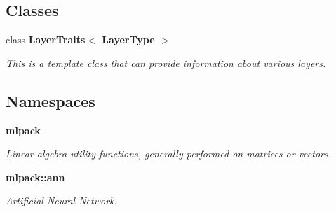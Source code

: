 \subsection*{Classes}
\begin{DoxyCompactItemize}
\item 
class \textbf{ Layer\+Traits$<$ Layer\+Type $>$}
\begin{DoxyCompactList}\small\item\em This is a template class that can provide information about various layers. \end{DoxyCompactList}\end{DoxyCompactItemize}
\subsection*{Namespaces}
\begin{DoxyCompactItemize}
\item 
 \textbf{ mlpack}
\begin{DoxyCompactList}\small\item\em Linear algebra utility functions, generally performed on matrices or vectors. \end{DoxyCompactList}\item 
 \textbf{ mlpack\+::ann}
\begin{DoxyCompactList}\small\item\em Artificial Neural Network. \end{DoxyCompactList}\end{DoxyCompactItemize}
